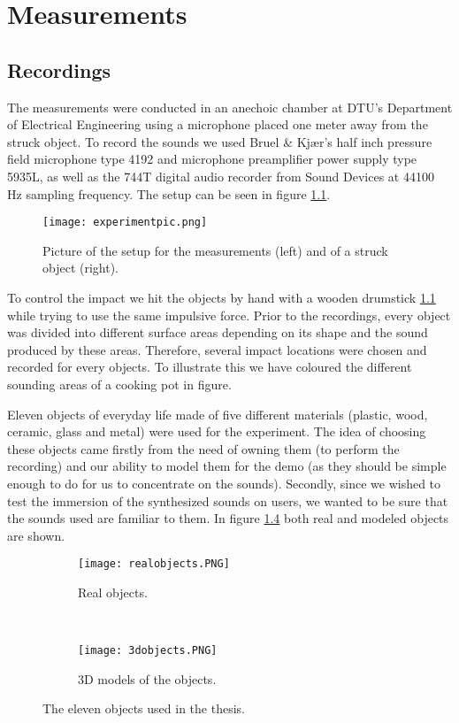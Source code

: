 \chapter{Measurements}\label{ch:measurements}

\section{Recordings}

The measurements were conducted in an anechoic chamber at DTU's Department of Electrical Engineering using a microphone placed one meter away from the struck object. To record the sounds we used Bruel \& Kjær's half inch pressure field microphone type 4192 and microphone preamplifier power supply type 5935L, as well as the 744T digital audio recorder from Sound Devices at 44100 Hz sampling frequency. The setup can be seen in figure \ref{fig:experiment}.

\begin{figure}[H]
  \centering
    \texttt{[image: experimentpic.png]}
      \caption{Picture of the setup for the measurements (left) and of a struck object (right).}\label{fig:experiment}
\end{figure}

To control the impact we hit the objects by hand with a wooden drumstick \ref{fig:experiment} while trying to use the same impulsive force. Prior to the recordings, every object was divided into different surface areas depending on its shape and the sound produced by these areas. Therefore, several impact locations were chosen and recorded for every objects. To illustrate this we have coloured the different sounding areas of a cooking pot in figure.

Eleven objects of everyday life made of five different materials (plastic, wood, ceramic, glass and metal) were used for the experiment. The idea of choosing these objects came firstly from the need of owning them (to perform the recording) and our ability to model them for the demo (as they should be simple enough to do for us to concentrate on the sounds). Secondly, since we wished to test the immersion of the synthesized sounds on users, we wanted to be sure that the sounds used are familiar to them. In figure \ref{fig:objects} both real and modeled objects are shown. 

\begin{figure}[H]
    \centering
    \begin{subfigure}[b]{0.7\textwidth}
        \texttt{[image: realobjects.PNG]}
        \caption{Real objects.}
        \label{fig:gull}
    \end{subfigure}
    ~ %
    \begin{subfigure}[b]{0.7\textwidth}
        \texttt{[image: 3dobjects.PNG]}
        \caption{3D models of the objects.}
        \label{fig:tiger}
    \end{subfigure}
    \caption{The eleven objects used in the thesis.}\label{fig:objects}
\end{figure}

